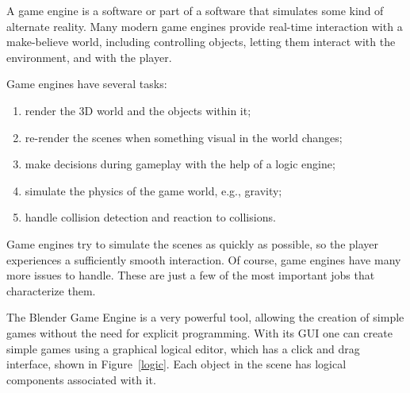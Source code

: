 A game engine is a software or part of a software that simulates some kind of alternate reality\cite{bookGameKit2}. Many modern game engines provide real-time interaction with a make-believe world, including controlling objects, letting them interact with the environment, and with the player. 

Game engines have several tasks:
\begin{enumerate}
\item render the 3D world and the objects within it;
\item re-render the scenes when something visual in the world changes;
\item make decisions during gameplay with the help of a logic engine;
\item simulate the physics of the game world, e.g., gravity;
\item handle collision detection and reaction to collisions.
\end{enumerate}

Game engines try to simulate the scenes as quickly as possible, so the player experiences a sufficiently smooth interaction. Of course, game engines have many more issues to handle. These are just a few of the most important jobs that characterize them.

The Blender Game Engine is a very powerful tool, allowing the creation of simple games without  the need for explicit programming. With its GUI one can create simple games using a graphical logical editor, which has a click and drag interface, shown in Figure~\ref{logic}. Each object in the scene has logical components associated with it. 

